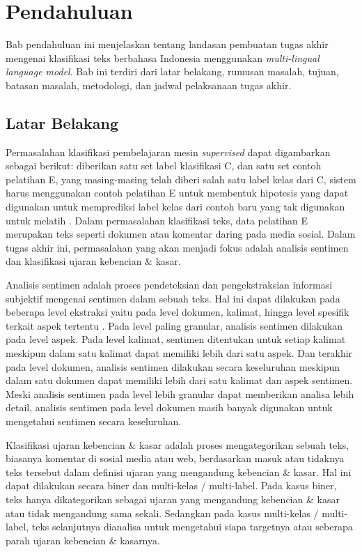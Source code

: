 \chapter{Pendahuluan}

Bab pendahuluan ini menjelaskan tentang landasan pembuatan tugas akhir mengenai klasifikasi teks berbahasa Indonesia menggunakan \textit{multi-lingual language model}. Bab ini terdiri dari latar belakang, rumusan masalah, tujuan, batasan masalah, metodologi, dan jadwal pelaksanaan tugas akhir.

\section{Latar Belakang}

Permasalahan klasifikasi pembelajaran mesin \textit{supervised} dapat digambarkan sebagai berikut: diberikan satu set label klasifikasi C, dan satu set contoh pelatihan E, yang masing-masing telah diberi salah satu label kelas dari C, sistem harus menggunakan contoh pelatihan E untuk membentuk hipotesis yang dapat digunakan untuk memprediksi label kelas dari contoh baru yang tak digunakan untuk melatih \parencite{mitchell_machine_1997}. Dalam permasalahan klasifikasi teks, data pelatihan E merupakan teks seperti dokumen atau komentar daring pada media sosial. Dalam tugas akhir ini, permasalahan yang akan menjadi fokus adalah analisis sentimen dan klasifikasi ujaran kebencian \& kasar.

Analisis sentimen adalah proses pendeteksian dan pengekstraksian informasi subjektif mengenai sentimen dalam sebuah teks. Hal ini dapat dilakukan pada beberapa level ekstraksi yaitu pada level dokumen, kalimat, hingga level spesifik terkait aspek tertentu \parencite{Liu2012}. Pada level paling granular, analisis sentimen dilakukan pada level aspek. Pada level kalimat, sentimen ditentukan untuk setiap kalimat meskipun dalam satu kalimat dapat memiliki lebih dari satu aspek. Dan terakhir pada level dokumen, analisis sentimen dilakukan secara keseluruhan meskipun dalam satu dokumen dapat memiliki lebih dari satu kalimat dan aspek sentimen. Meski analisis sentimen pada level lebih granular dapat memberikan analisa lebih detail, analisis sentimen pada level dokumen masih banyak digunakan untuk mengetahui sentimen secara keseluruhan.

Klasifikasi ujaran kebencian \& kasar adalah proses mengategorikan sebuah teks, biasanya komentar di sosial media atau web, berdasarkan masuk atau tidaknya teks tersebut dalam definisi ujaran yang mengandung kebencian \& kasar. Hal ini dapat dilakukan secara biner dan multi-kelas / multi-label. Pada kasus biner, teks hanya dikategorikan sebagai ujaran yang mengandung kebencian \& kasar atau tidak mengandung sama sekali. Sedangkan pada kasus multi-kelas / multi-label, teks selanjutnya dianalisa untuk mengetahui siapa targetnya atau seberapa parah ujaran kebencian \& kasarnya.

